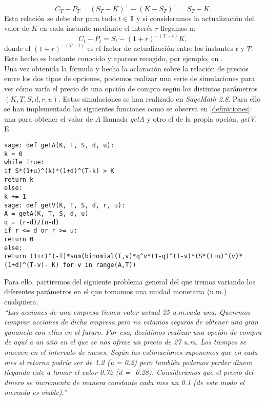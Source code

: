 \[
C_T - P_T = (S_T - K)^+ - (K-S_T)^+ = S_T - K.
\]
Esta relación se debe dar para todo $ t \in \mathbb{T} $ y si consideramos la actualización del valor de $ K $ en cada instante mediante el interés $ r $ llegamos a:
\[
C_t - P_t = S_t - (1+r)^{-(T-t)}K,
\]
donde el $ (1+r)^{-(T-t)} $ es el factor de actualización entre los instantes $ t $ y $ T $. Este hecho es bastante conocido y aparece recogido, por ejemplo, en \cite{elliot1999mathematics}.\\

Una vez obtenida la fórmula y hecha la aclaración sobre la relación de precios entre los dos tipos de opciones, podemos realizar una serie de simulaciones para ver cómo varía el precio de una opción de compra según los distintos parámetros $ (K, T, S, d, r, u) $. Estas simulaciones se han realizado en  \textit{SageMath 2.8}. Para ello se han implementado las siguientes funciones como se observa en \ref{definiciones}: una para obtener el valor de $ A $ llamada \textit{getA} y otro el de la propia opción, \textit{getV}. E

\begin{lstlisting}[label={definiciones}, caption={Definición en Sage de las funciones}, morekeywords={sage}]
sage: def getA(K, T, S, d, u):
k = 0
while True:
if S*(1+u)^(k)*(1+d)^(T-k) > K
return k
else:
k += 1
sage: def getV(K, T, S, d, r, u):
A = getA(K, T, S, d, u)
q = (r-d)/(u-d)
if r <= d or r >= u:
return 0
else:
return (1+r)^(-T)*sum(binomial(T,v)*q^v*(1-q)^(T-v)*(S*(1+u)^(v)*(1+d)^(T-v)- K) for v in range(A,T))           	 
\end{lstlisting}

Para ello, partiremos del siguiente problema general del que iremos variando los diferentes parámetros en el que tomamos una unidad monetaria (u.m.) cualquiera. \\

\textit{``Las acciones de una empresa tienen valor actual 25 u.m.cada una. Queremos comprar acciones de dicha empresa pero no estamos seguros de obtener una gran ganancia con ellas en el futuro. Por eso, decidimos realizar una opción de compra de aquí a un año en el que se nos ofrece un precio de 27 u.m. Los tiempos se mueven en el intervalo de meses. Según las estimaciones suponemos que en cada mes el retorno podría ser de 1.2 (u = 0.2)  pero también podemos perder dinero llegando este a tomar el valor 0.72 (d = -0.28). Consideramos que el precio del dinero se incrementa de manera constante cada mes un 0.1 (de este modo el mercado es viable).''} \\

